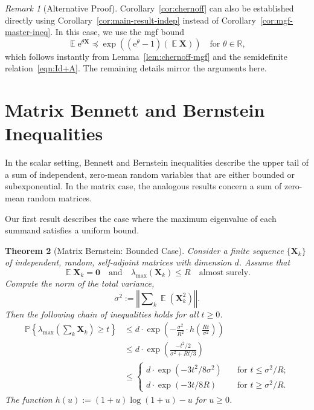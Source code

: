 \documentclass[11pt,letterpaper,twoside,reqno,draft]{amsart}
\newtheorem{thm}{Theorem}
\theoremstyle{remark}
\newtheorem{rem}[thm]{Remark}
\numberwithin{equation}{section}
\numberwithin{thm}{section}
\begin{document}
\begin{rem}[Alternative Proof]
Corollary~\ref{cor:chernoff} can also be established directly using Corollary~\ref{cor:main-result-indep} instead of Corollary~\ref{cor:mgf-master-ineq}.  In this case, we use the mgf bound
$$
{\operatorname{\mathbb{E}}} {\mathrm{e}}^{\theta {\bm{{X}}}}
	{\preccurlyeq} \exp\left( ({\mathrm{e}}^{\theta} - 1) ({\operatorname{\mathbb{E}}} {\bm{{X}}}) \right)
	\quad\text{for $\theta \in \mathbb{R}$},
$$
which follows instantly from Lemma~\ref{lem:chernoff-mgf} and the semidefinite relation~\eqref{eqn:Id+A}.  The remaining details mirror the arguments here.
\end{rem}

\section{Matrix Bennett and Bernstein Inequalities} \label{sec:bennett}

In the scalar setting, Bennett and Bernstein inequalities describe the upper tail of a sum of independent, zero-mean random variables that are either bounded or subexponential.  In the matrix case, the analogous results concern a sum of zero-mean random matrices.

Our first result describes the case where the maximum eigenvalue of each summand satisfies a uniform bound.

\begin{thm}[Matrix Bernstein: Bounded Case] \label{thm:bernstein-bdd}
Consider a finite sequence $\{ {\bm{{X}}}_k \}$ of independent, random, self-adjoint matrices with dimension $d$.  Assume that
$$
{\operatorname{\mathbb{E}}} {\bm{{X}}}_k = {\bm{{0}}}
\quad\text{and}\quad
\lambda_{\max}({\bm{{X}}}_k) \leq R
\quad\text{almost surely.}
$$
Compute the norm of the total variance,
$$
\sigma^2 := {\left\Vert {{ \sum\nolimits_k {\operatorname{\mathbb{E}}} \left({\bm{{X}}}_k^2 \right) }} \right\Vert}.
$$
Then the following chain of inequalities holds for all $t \geq 0$.
\begin{align*}
{\mathbb{P}\left\{ {{ \lambda_{\max}\left( \sum\nolimits_k {\bm{{X}}}_k \right) \geq t }} \right\}}
	&\leq d \cdot \exp\left( - \frac{\sigma^2}{R^2} \cdot h\!\left( \frac{Rt}{\sigma^2} \right) \right)
	\tag{i} \\
	&\leq d \cdot \exp\left( \frac{-t^2/2}{\sigma^2 + Rt/3} \right)
	\tag{ii} \\
	&\leq \begin{cases} d \cdot \exp( - 3t^2/8\sigma^2 ) &
	\quad\text{for $t \leq \sigma^2 / R$;} \\
	
	d \cdot \exp( -3t/8R ) &
	\quad\text{for $t \geq \sigma^2 / R$}.
	
	\end{cases} \tag{iii}
\end{align*}
The function $h(u) := (1+u)\log(1+u) - u$ for $u \geq 0$.
\end{thm}
\end{document}
